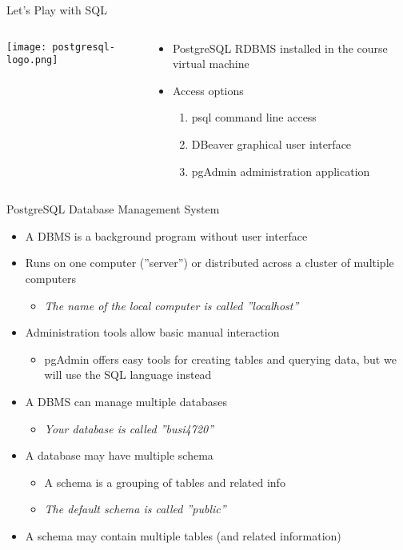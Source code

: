 \documentclass[ignorenonframetext,xcolor=x11names]{beamer}
\begin{document}
\begin{frame}{Let's Play with SQL}
\begin{columns}
\begin{column}{.15\textwidth}
\centering 
\texttt{[image: postgresql-logo.png]}
\end{column}
\begin{column}{.85\textwidth}
\begin{itemize}
  \item PostgreSQL RDBMS installed in the course virtual machine
  \item Access options
  \begin{enumerate}
     \item psql command line access
     \item DBeaver graphical user interface
     \item pgAdmin administration application
  \end{enumerate}
\end{itemize}
\end{column}
\end{columns}
\end{frame}

\begin{frame}{PostgreSQL Database Management System}
\begin{itemize}
  \item A DBMS is a background program without user interface
  \item Runs on one computer (''server'') or distributed across a cluster of multiple computers
  \begin{itemize}
    \item \emph{The name of the local computer is called ''localhost''}
  \end{itemize}
  \item Administration tools allow basic manual interaction
  \begin{itemize}
    \item pgAdmin offers easy tools for creating tables and querying data, but we will use the SQL language instead
  \end{itemize}
  \item A DBMS can manage multiple databases
  \begin{itemize}
    \item \emph{Your database is called ''busi4720''}
  \end{itemize}
  \item A database may have multiple schema
  \begin{itemize}
    \item A schema is a grouping of tables and related info
    \item \emph{The default schema is called ''public''}
  \end{itemize}
  \item A schema may contain multiple tables (and related information)
\end{itemize}
\end{frame}
\end{document}
